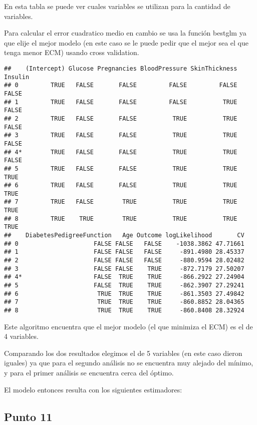 \documentclass[
]{article}
\begin{document}
En esta tabla se puede ver cuales variables se utilizan para la cantidad
de variables.

Para calcular el error cuadratico medio en cambio se usa la función
bestglm ya que elije el mejor modelo (en este caso se le puede pedir que
el mejor sea el que tenga menor ECM) usando cross validation.

\begin{verbatim}
##    (Intercept) Glucose Pregnancies BloodPressure SkinThickness Insulin
## 0         TRUE   FALSE       FALSE         FALSE         FALSE   FALSE
## 1         TRUE   FALSE       FALSE         FALSE          TRUE   FALSE
## 2         TRUE   FALSE       FALSE          TRUE          TRUE   FALSE
## 3         TRUE   FALSE       FALSE          TRUE          TRUE   FALSE
## 4*        TRUE   FALSE       FALSE          TRUE          TRUE   FALSE
## 5         TRUE   FALSE       FALSE          TRUE          TRUE    TRUE
## 6         TRUE   FALSE       FALSE          TRUE          TRUE    TRUE
## 7         TRUE   FALSE        TRUE          TRUE          TRUE    TRUE
## 8         TRUE    TRUE        TRUE          TRUE          TRUE    TRUE
##    DiabetesPedigreeFunction   Age Outcome logLikelihood       CV
## 0                     FALSE FALSE   FALSE    -1038.3862 47.71661
## 1                     FALSE FALSE   FALSE     -891.4980 28.45337
## 2                     FALSE FALSE   FALSE     -880.9594 28.02482
## 3                     FALSE FALSE    TRUE     -872.7179 27.50207
## 4*                    FALSE  TRUE    TRUE     -866.2922 27.24904
## 5                     FALSE  TRUE    TRUE     -862.3907 27.29241
## 6                      TRUE  TRUE    TRUE     -861.3503 27.49842
## 7                      TRUE  TRUE    TRUE     -860.8852 28.04365
## 8                      TRUE  TRUE    TRUE     -860.8408 28.32924
\end{verbatim}

Este algoritmo encuentra que el mejor modelo (el que minimiza el ECM) es
el de 4 variables.

Comparando los dos resultados elegimos el de 5 variables (en este caso
dieron iguales) ya que para el segundo análisis no se encuentra muy
alejado del mínimo, y para el primer análisis se encuentra cerca del
óptimo.

El modelo entonces resulta con los siguientes estimadores:

\hypertarget{punto-11}{%
\subsection{Punto 11}\label{punto-11}}
\end{document}
